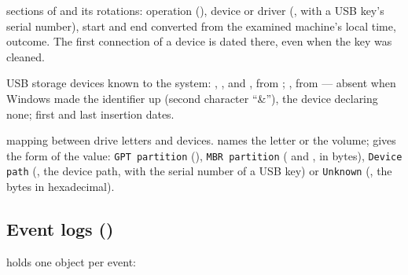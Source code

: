 \documentclass[11pt,a4paper,oneside]{report}
\begin{document}
\begin{description}[style=nextline,leftmargin=1.2em]
  \item[\fichier{setupapi.json}] sections of  and its
        rotations: operation (), device or driver
        (, with a USB key's serial number), start and end
        converted from the examined machine's local time, outcome. The first
        connection of a device is dated there, even when the 
        key was cleaned.
  \item[\fichier{Usbstor.json}] USB storage devices known to the system:
        , ,  and ,
        from ; , from 
        — absent when Windows made the identifier up (second character
        ``\&''), the device declaring none; first and last insertion dates.
  \item[\fichier{mounted\_device.json}] mapping between drive letters and
        devices.  names the letter or the volume; 
        gives the form of the value: \texttt{GPT partition}
        (), \texttt{MBR partition}
        ( and , in bytes),
        \texttt{Device path} (, the device path, with the serial
        number of a USB key) or \texttt{Unknown} (, the bytes in
        hexadecimal).
\end{description}

\subsection{Event logs ()}

 holds one object per event:
\end{document}
